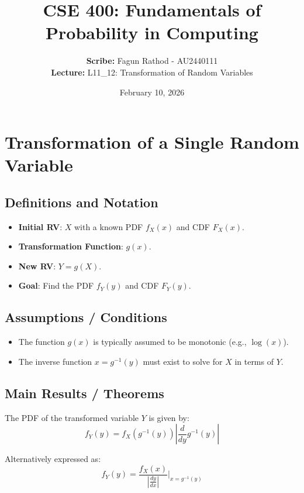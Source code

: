 \documentclass[11pt]{article}
\begin{document}
\title{CSE 400: Fundamentals of Probability in Computing}
\author{\textbf{Scribe:} Fagun Rathod - AU2440111 \\ 
        \textbf{Lecture:} L11\_12: Transformation of Random Variables}
\date{February 10, 2026}
\maketitle

\hr

\section{Transformation of a Single Random Variable}

\subsection{Definitions and Notation}
\begin{itemize}
    \item \textbf{Initial RV}: $X$ with a known PDF $f_X(x)$ and CDF $F_X(x)$.
    \item \textbf{Transformation Function}: $g(x)$.
    \item \textbf{New RV}: $Y = g(X)$.
    \item \textbf{Goal}: Find the PDF $f_Y(y)$ and CDF $F_Y(y)$.
\end{itemize}

\subsection{Assumptions / Conditions}
\begin{itemize}
    \item The function $g(x)$ is typically assumed to be monotonic (e.g., $\log(x)$).
    \item The inverse function $x = g^{-1}(y)$ must exist to solve for $X$ in terms of $Y$.
\end{itemize}

\subsection{Main Results / Theorems}
The PDF of the transformed variable $Y$ is given by:
\[ f_Y(y) = f_X(g^{-1}(y)) \left| \frac{d}{dy} g^{-1}(y) \right| \]

Alternatively expressed as:
\[ f_Y(y) = \frac{f_X(x)}{\left| \frac{dy}{dx} \right|} \bigg|_{x=g^{-1}(y)} \]
\end{document}
